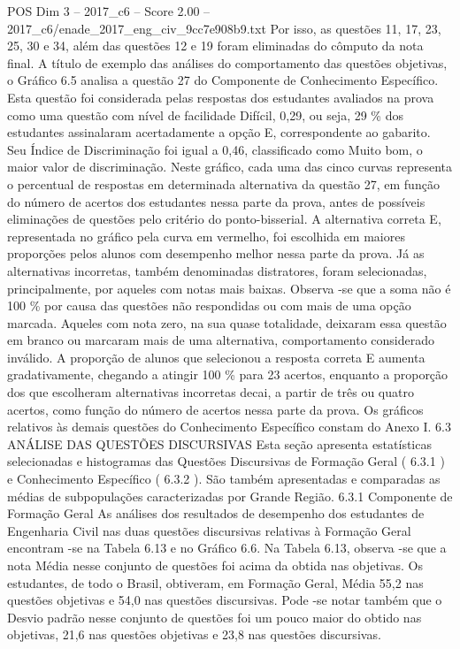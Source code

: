 \begin{textsample}{POS Dim 3 – 2017\_c6 – Score 2.00 – 2017\_c6/enade\_2017\_eng\_civ\_9cc7e908b9.txt}
Por isso, as questões 11, 17, 23, 25, 30 e 34, além das questões 12 e 19 foram eliminadas do cômputo da nota final.
A título de exemplo das análises do comportamento das questões objetivas, o Gráfico 6.5 analisa a questão 27 do Componente de Conhecimento Específico.
Esta questão foi considerada pelas respostas dos estudantes avaliados na prova como uma questão com nível de facilidade Difícil, 0,29, ou seja, 29 \% dos estudantes assinalaram acertadamente a opção E, correspondente ao gabarito.
Seu Índice de Discriminação foi igual a 0,46, classificado como Muito bom, o maior valor de discriminação.
Neste gráfico, cada uma das cinco curvas representa o percentual de respostas em determinada alternativa da questão 27, em função do número de acertos dos estudantes nessa parte da prova, antes de possíveis eliminações de questões pelo critério do ponto-bisserial.
A alternativa correta E, representada no gráfico pela curva em vermelho, foi escolhida em maiores proporções pelos alunos com desempenho melhor nessa parte da prova.
Já as alternativas incorretas, também denominadas distratores, foram selecionadas, principalmente, por aqueles com notas mais baixas.
Observa -se que a soma não é 100 \% por causa das questões não respondidas ou com mais de uma opção marcada.
Aqueles com nota zero, na sua quase totalidade, deixaram essa questão em branco ou marcaram mais de uma alternativa, comportamento considerado inválido.
A proporção de alunos que selecionou a resposta correta E aumenta gradativamente, chegando a atingir 100 \% para 23 acertos, enquanto a proporção dos que escolheram alternativas incorretas decai, a partir de três ou quatro acertos, como função do número de acertos nessa parte da prova.
Os gráficos relativos às demais questões do Conhecimento Específico constam do Anexo I. 6.3 ANÁLISE DAS QUESTÕES DISCURSIVAS Esta seção apresenta estatísticas selecionadas e histogramas das Questões Discursivas de Formação Geral ( 6.3.1 ) e Conhecimento Específico ( 6.3.2 ).
São também apresentadas e comparadas as médias de subpopulações caracterizadas por Grande Região. 6.3.1 Componente de Formação Geral As análises dos resultados de desempenho dos estudantes de Engenharia Civil nas duas questões discursivas relativas à Formação Geral encontram -se na Tabela 6.13 e no Gráfico 6.6.
Na Tabela 6.13, observa -se que a nota Média nesse conjunto de questões foi acima da obtida nas objetivas.
Os estudantes, de todo o Brasil, obtiveram, em Formação Geral, Média 55,2 nas questões objetivas e 54,0 nas questões discursivas.
Pode -se notar também que o Desvio padrão nesse conjunto de questões foi um pouco maior do obtido nas objetivas, 21,6 nas questões objetivas e 23,8 nas questões discursivas.

\end{textsample}
